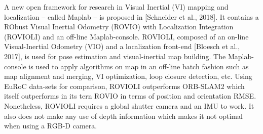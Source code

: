 A new open framework for research in Visual Inertial (VI) mapping and localization – called Maplab – is proposed in [Schneider et al., 2018]. It contains a RObust Visual Inertial Odometry (ROVIO) with Localization Integration (ROVIOLI) and an oﬀ-line Maplab-console. ROVIOLI, composed of an on-line Visual-Inertial Odometry (VIO) and a localization front-end [Bloesch et al., 2017], is used for pose estimation and visual-inertial map building. The Maplab-console is used to apply algorithms on map in an oﬀ-line batch fashion such as map alignment and merging, VI optimization, loop closure detection, etc. Using EuRoC data-sets for comparison, ROVIOLI outperforms ORB-SLAM2 which itself outperforms in its tern ROVIO in terms of position and orientation RMSE. Nonetheless, ROVIOLI requires a global shutter camera and an IMU to work. It also does not make any use of depth information which makes it not optimal when using a RGB-D camera.\\\\
